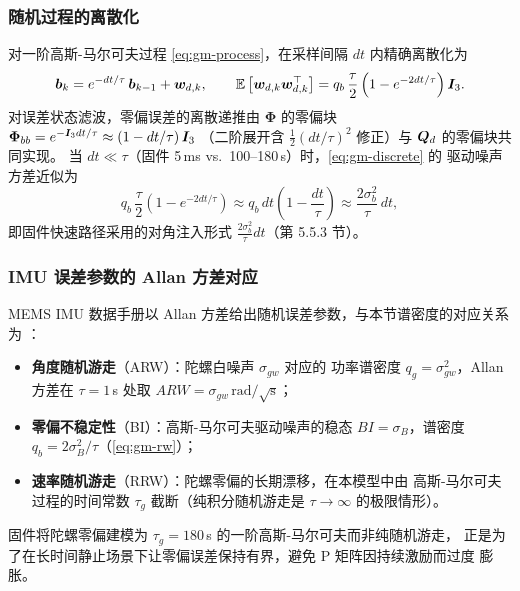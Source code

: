 \subsubsection{随机过程的离散化}

对一阶高斯-马尔可夫过程 \cref{eq:gm-process}，在采样间隔 $dt$ 内精确离散化为
\begin{equation}
  \boldsymbol{b}_k = e^{-dt/\tau}\,\boldsymbol{b}_{k-1} + \boldsymbol{w}_{d,k},
  \qquad
  \mathbb{E}\left[\boldsymbol{w}_{d,k}\boldsymbol{w}_{d,k}^{\top}\right] = q_b\,\frac{\tau}{2}
    \left(1 - e^{-2dt/\tau}\right)\boldsymbol{I}_3.
  \label{eq:gm-discrete}
\end{equation}
对误差状态滤波，零偏误差的离散递推由 $\bm{\Phi}$ 的零偏块
$\bm{\Phi}_{bb} = e^{-\boldsymbol{I}_3 dt/\tau} \approx \left(1 - dt/\tau\right)\boldsymbol{I}_3$
（二阶展开含 $\frac12(dt/\tau)^2$ 修正）与 $\boldsymbol{Q}_d$ 的零偏块共同实现。
当 $dt \ll \tau$（固件 5\,ms vs.\ 100--180\,s）时，\cref{eq:gm-discrete} 的
驱动噪声方差近似为
\begin{equation}
  q_b\,\frac{\tau}{2}\left(1 - e^{-2dt/\tau}\right)
  \approx q_b\,dt\left(1 - \frac{dt}{\tau}\right)
  \approx \frac{2\sigma_b^2}{\tau}\,dt,
  \label{eq:gm-discrete-approx}
\end{equation}
即固件快速路径采用的对角注入形式 $\frac{2\sigma_b^2}{\tau}dt$（第 5.5.3 节）。

\subsubsection{IMU 误差参数的 Allan 方差对应}

MEMS IMU 数据手册以 Allan 方差给出随机误差参数，与本节谱密度的对应关系为
\cite{Groves2013,Titterton2014}：
\begin{itemize}
  \item \textbf{角度随机游走}（ARW）：陀螺白噪声 $\sigma_{gw}$ 对应的
    功率谱密度 $q_g = \sigma_{gw}^2$，Allan 方差在 $\tau=1$\,s 处取
    $ARW = \sigma_{gw}\,\text{rad}/\sqrt{\text{s}}$；
  \item \textbf{零偏不稳定性}（BI）：高斯-马尔可夫驱动噪声的稳态
    $BI = \sigma_B$，谱密度 $q_b = 2\sigma_B^2/\tau$（\cref{eq:gm-rw}）；
  \item \textbf{速率随机游走}（RRW）：陀螺零偏的长期漂移，在本模型中由
    高斯-马尔可夫过程的时间常数 $\tau_g$ 截断（纯积分随机游走是
    $\tau \to \infty$ 的极限情形）。
\end{itemize}
固件将陀螺零偏建模为 $\tau_g = 180$\,s 的一阶高斯-马尔可夫而非纯随机游走，
正是为了在长时间静止场景下让零偏误差保持有界，避免 P 矩阵因持续激励而过度
膨胀。

